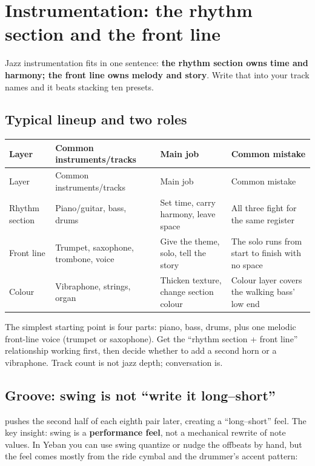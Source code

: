 \section{Instrumentation: the rhythm section and the front line}
\label{sec:jazz-craft}

Jazz instrumentation fits in one sentence: \textbf{the rhythm section owns time and harmony; the front line owns melody and story}. Write that into your track names and it beats stacking ten presets.

\subsection{Typical lineup and two roles}
\label{sec:jazz-instrumentation}

\begin{longtable}{p{}p{}p{}p{}}
\toprule
Layer & Common instruments/tracks & Main job & Common mistake \\
\midrule
\endfirsthead
\toprule
Layer & Common instruments/tracks & Main job & Common mistake \\
\midrule
\endhead
Rhythm section & Piano/guitar, bass, drums & Set time, carry harmony, leave space & All three fight for the same register \\
Front line & Trumpet, saxophone, trombone, voice & Give the theme, solo, tell the story & The solo runs from start to finish with no space \\
Colour & Vibraphone, strings, organ & Thicken texture, change section colour & Colour layer covers the walking bass' low end \\
\bottomrule
\end{longtable}

The simplest starting point is four parts: piano, bass, drums, plus one melodic front-line voice (trumpet or saxophone). Get the ``rhythm section + front line'' relationship working first, then decide whether to add a second horn or a vibraphone. Track count is not jazz depth; conversation is.

\subsection{Groove: swing is not ``write it long--short''}
\label{sec:jazz-groove}

 pushes the second half of each eighth pair later, creating a ``long--short'' feel. The key insight: swing is a \textbf{performance feel}, not a mechanical rewrite of note values. In Yeban you can use swing quantize or nudge the offbeats by hand, but the feel comes mostly from the ride cymbal and the drummer's accent pattern:

